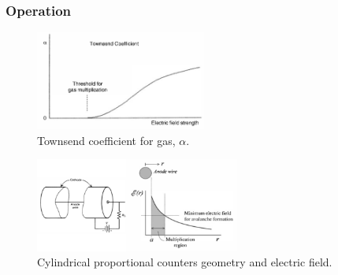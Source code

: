\subsubsection{Operation}
\begin{figure}[ht]
    \centering
    \includegraphics[width=0.5\textwidth]{images/townsend_coefficient.png}
    \caption{Townsend coefficient for gas, $\alpha$.}
    \label{fig:townsend_coefficient}
\end{figure}
\begin{figure}[ht]
    \centering
    \includegraphics[width=0.6\textwidth]{images/Cylindrical_prop_counter.png}
    \caption{Cylindrical proportional counters geometry and electric field.}
    \label{fig:Cylindrical_prop_counter}
\end{figure}
